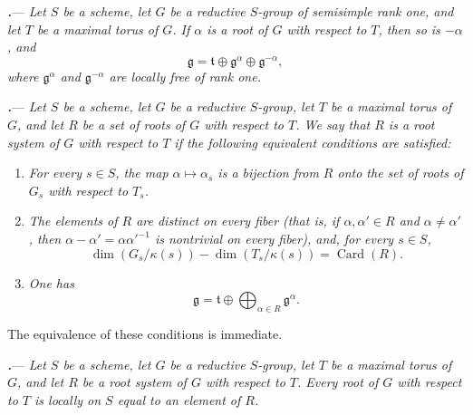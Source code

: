 \par\medskip\noindent
\textbf{\textit{.}}---
\textit{Let \(S\) be a scheme, let \(G\) be a reductive \(S\)-group
of semisimple rank one, and let \(T\) be a maximal torus of \(G\).  If
\(\alpha\) is a root of \(G\) with respect to \(T\), then so is
\(-\alpha\), and}
\[
  \mathfrak g
  =
  \mathfrak t
  \oplus \mathfrak g^\alpha
  \oplus \mathfrak g^{-\alpha},
\]
\textit{where \(\mathfrak g^\alpha\) and
\(\mathfrak g^{-\alpha}\) are locally free of rank one.}

\par\medskip\noindent
{}\textbf{\textit{.}}---
\textit{Let \(S\) be a scheme, let \(G\) be a reductive \(S\)-group,
let \(T\) be a maximal torus of \(G\), and let \(R\) be a set of roots
of \(G\) with respect to \(T\).  We say that \(R\) is a \emph{root
system} of \(G\) with respect to \(T\) if the following equivalent
conditions are satisfied:}

\begin{enumerate}
\item[\textit{(i)}]
\textit{For every \(s\in S\), the map
\(\alpha\mapsto\alpha_s\) is a bijection from \(R\) onto the set of
roots of \(G_s\) with respect to \(T_s\).}

\item[\textit{\SGAInlineRefTarget{sga3:xix:definition:3:6:item:ii}(ii)}]
\textit{The elements of \(R\) are distinct on every fiber
\textup{(that is, if \(\alpha,\alpha'\in R\) and
\(\alpha\ne\alpha'\), then
\(\alpha-\alpha'=\alpha{\alpha'}^{-1}\) is nontrivial on every
fiber)}, and, for every \(s\in S\),}
\[
  \dim(G_s/\kappa(s))-\dim(T_s/\kappa(s))=\operatorname{Card}(R).
\]

\item[\textit{\SGAInlineRefTarget{sga3:xix:definition:3:6:item:iii}(iii)}]
\textit{One has}
\[
  \mathfrak g
  =
  \mathfrak t
  \oplus
  \bigoplus_{\alpha\in R}\mathfrak g^\alpha.
\]
\end{enumerate}

The equivalence of these conditions is immediate.

\par\medskip\noindent
{}\textbf{\textit{.}}---
\textit{Let \(S\) be a scheme, let \(G\) be a reductive \(S\)-group,
let \(T\) be a maximal torus of \(G\), and let \(R\) be a root system
of \(G\) with respect to \(T\).  Every root of \(G\) with respect to
\(T\) is locally on \(S\) equal to an element of \(R\).}


